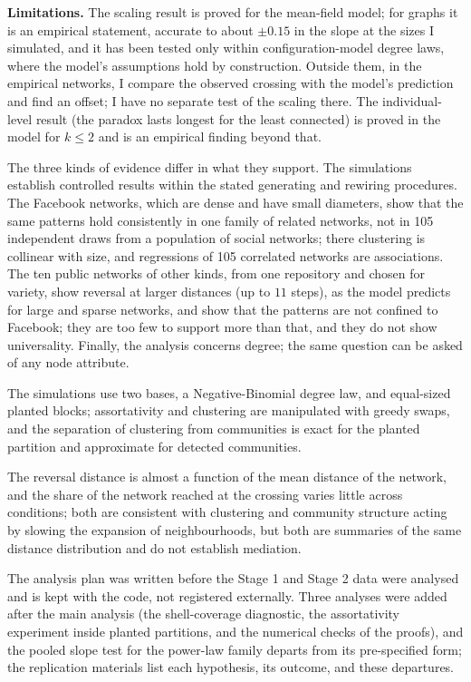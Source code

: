 \documentclass{nws}
\begin{document}
\textbf{Limitations.} The scaling result is proved for the mean-field model; for graphs it is an
empirical statement, accurate to about $\pm0.15$ in the slope at the sizes I simulated, and it has been tested only within configuration-model degree laws, where the model's assumptions hold by construction. Outside them, in the empirical networks, I compare the observed crossing with the model's prediction and find an offset; I have no separate test of the scaling there. The individual-level result (the paradox lasts longest for the least connected) is proved in the model for $k\le2$ and is an empirical finding beyond that.

The three kinds of evidence differ in what they support. The simulations establish controlled results within the stated generating and rewiring procedures. The Facebook networks, which are dense and have small diameters, show that the same patterns hold consistently in one family of related networks, not in 105 independent draws from a population of social networks; there clustering is collinear with size, and regressions of 105 correlated networks are associations. The ten public networks of other kinds, from one repository and chosen for variety, show reversal at larger distances (up to $11$ steps), as the model predicts for large and sparse networks, and show that the patterns are not confined to Facebook; they are too few to support more than that, and they do not show universality. Finally, the analysis concerns degree; the same question can be asked of any node attribute.

The simulations use two bases, a Negative-Binomial degree law, and equal-sized planted
blocks; assortativity and clustering are manipulated with greedy swaps, and the
separation of clustering from communities is exact for the planted partition and
approximate for detected communities.

The reversal distance is almost a function of
the mean distance of the network, and the share of the network reached at the crossing
varies little across conditions; both are consistent with clustering and community
structure acting by slowing the expansion of neighbourhoods, but both are summaries of the
same distance distribution and do not establish mediation.

The analysis plan was written before the Stage 1 and Stage 2 data were analysed and is kept with the code, not registered externally. Three analyses were added after the main analysis (the shell-coverage diagnostic, the assortativity experiment inside planted partitions, and the numerical checks of the proofs), and the pooled slope test for the power-law family departs from its pre-specified form; the replication materials list each hypothesis, its outcome, and these departures.
\end{document}
